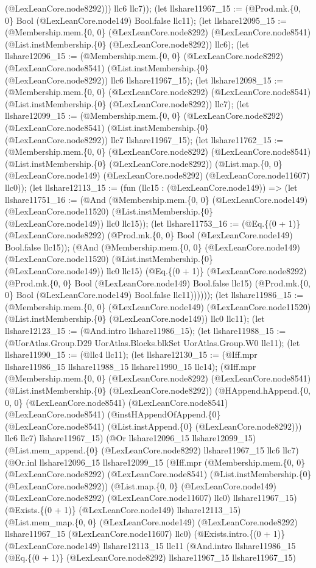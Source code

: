 \documentclass[11pt]{article}
\begin{document}
(@LexLeanCore.node8292))) llc6 llc7)); (let llshare11967\_15 := (@Prod.mk.\{0, 0\} Bool (@LexLeanCore.node149) Bool.false llc11); (let llshare12095\_15 := (@Membership.mem.\{0, 0\} (@LexLeanCore.node8292) (@LexLeanCore.node8541) (@List.instMembership.\{0\} (@LexLeanCore.node8292)) llc6); (let llshare12096\_15 := (@Membership.mem.\{0, 0\} (@LexLeanCore.node8292) (@LexLeanCore.node8541) (@List.instMembership.\{0\} (@LexLeanCore.node8292)) llc6 llshare11967\_15); (let llshare12098\_15 := (@Membership.mem.\{0, 0\} (@LexLeanCore.node8292) (@LexLeanCore.node8541) (@List.instMembership.\{0\} (@LexLeanCore.node8292)) llc7); (let llshare12099\_15 := (@Membership.mem.\{0, 0\} (@LexLeanCore.node8292) (@LexLeanCore.node8541) (@List.instMembership.\{0\} (@LexLeanCore.node8292)) llc7 llshare11967\_15); (let llshare11762\_15 := (@Membership.mem.\{0, 0\} (@LexLeanCore.node8292) (@LexLeanCore.node8541) (@List.instMembership.\{0\} (@LexLeanCore.node8292)) (@List.map.\{0, 0\} (@LexLeanCore.node149) (@LexLeanCore.node8292) (@LexLeanCore.node11607) llc0)); (let llshare12113\_15 := (fun (llc15 : (@LexLeanCore.node149)) => (let llshare11751\_16 := (@And (@Membership.mem.\{0, 0\} (@LexLeanCore.node149) (@LexLeanCore.node11520) (@List.instMembership.\{0\} (@LexLeanCore.node149)) llc0 llc15)); (let llshare11753\_16 := (@Eq.\{(0 + 1)\} (@LexLeanCore.node8292) (@Prod.mk.\{0, 0\} Bool (@LexLeanCore.node149) Bool.false llc15)); (@And (@Membership.mem.\{0, 0\} (@LexLeanCore.node149) (@LexLeanCore.node11520) (@List.instMembership.\{0\} (@LexLeanCore.node149)) llc0 llc15) (@Eq.\{(0 + 1)\} (@LexLeanCore.node8292) (@Prod.mk.\{0, 0\} Bool (@LexLeanCore.node149) Bool.false llc15) (@Prod.mk.\{0, 0\} Bool (@LexLeanCore.node149) Bool.false llc11)))))); (let llshare11986\_15 := (@Membership.mem.\{0, 0\} (@LexLeanCore.node149) (@LexLeanCore.node11520) (@List.instMembership.\{0\} (@LexLeanCore.node149)) llc0 llc11); (let llshare12123\_15 := (@And.intro llshare11986\_15); (let llshare11988\_15 := (@UorAtlas.Group.D29 UorAtlas.Blocks.blkSet UorAtlas.Group.W0 llc11); (let llshare11990\_15 := (@llc4 llc11); (let llshare12130\_15 := (@Iff.mpr llshare11986\_15 llshare11988\_15 llshare11990\_15 llc14); (@Iff.mpr (@Membership.mem.\{0, 0\} (@LexLeanCore.node8292) (@LexLeanCore.node8541) (@List.instMembership.\{0\} (@LexLeanCore.node8292)) (@HAppend.hAppend.\{0, 0, 0\} (@LexLeanCore.node8541) (@LexLeanCore.node8541) (@LexLeanCore.node8541) (@instHAppendOfAppend.\{0\} (@LexLeanCore.node8541) (@List.instAppend.\{0\} (@LexLeanCore.node8292))) llc6 llc7) llshare11967\_15) (@Or llshare12096\_15 llshare12099\_15) (@List.mem\_append.\{0\} (@LexLeanCore.node8292) llshare11967\_15 llc6 llc7) (@Or.inl llshare12096\_15 llshare12099\_15 (@Iff.mpr (@Membership.mem.\{0, 0\} (@LexLeanCore.node8292) (@LexLeanCore.node8541) (@List.instMembership.\{0\} (@LexLeanCore.node8292)) (@List.map.\{0, 0\} (@LexLeanCore.node149) (@LexLeanCore.node8292) (@LexLeanCore.node11607) llc0) llshare11967\_15) (@Exists.\{(0 + 1)\} (@LexLeanCore.node149) llshare12113\_15) (@List.mem\_map.\{0, 0\} (@LexLeanCore.node149) (@LexLeanCore.node8292) llshare11967\_15 (@LexLeanCore.node11607) llc0) (@Exists.intro.\{(0 + 1)\} (@LexLeanCore.node149) llshare12113\_15 llc11 (@And.intro llshare11986\_15 (@Eq.\{(0 + 1)\} (@LexLeanCore.node8292) llshare11967\_15 llshare11967\_15) 
\end{document}
